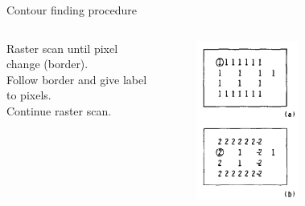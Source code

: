 \documentclass[12pt, dvipsnames]{beamer}
\begin{document}
\begin{frame}{Contour finding procedure \footnotemark}
    \begin{columns}
        \alert{Raster scan} until pixel change (border). \\[0.5em]
        Follow border and give \alert{label} to pixels. \\[0.5em]
        Continue raster scan.
        \begin{figure}
            \centering
            \includegraphics[width=1\textwidth]{resources/sudoku/border_follow_1.png}
        \end{figure}
        \begin{figure}

\end{figure}
\end{columns}
\end{frame}
\end{document}
